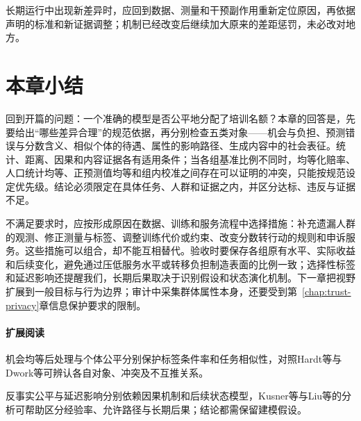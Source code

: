 长期运行中出现新差异时，应回到数据、测量和干预副作用重新定位原因，再依据声明的标准和新证据调整；机制已经改变后继续加大原来的差距惩罚，未必改对地方。

\section{本章小结}
\label{sec:fairness-summary}

回到开篇的问题：一个准确的模型是否公平地分配了培训名额？本章的回答是，先要给出“哪些差异合理”的规范依据，再分别检查五类对象——机会与负担、预测错误与分数含义、相似个体的待遇、属性的影响路径、生成内容中的社会表征。统计、距离、因果和内容证据各有适用条件；当各组基准比例不同时，均等化赔率、人口统计均等、正预测值均等和组内校准之间存在可以证明的冲突，只能按规范设定优先级。结论必须限定在具体任务、人群和证据之内，并区分达标、违反与证据不足。

不满足要求时，应按形成原因在数据、训练和服务流程中选择措施：补充遗漏人群的观测、修正测量与标签、调整训练代价或约束、改变分数转行动的规则和申诉服务。这些措施可以组合，却不能互相替代。验收时要保存各组原有水平、实际收益和后续变化，避免通过压低服务水平或转移负担制造表面的比例一致；选择性标签和延迟影响还提醒我们，长期后果取决于识别假设和状态演化机制。下一章把视野扩展到一般目标与行为边界；审计中采集群体属性本身，还要受到第~\ref{chap:trust-privacy}章信息保护要求的限制。

\paragraph{扩展阅读}

机会均等后处理与个体公平分别保护标签条件率和任务相似性，对照Hardt等与Dwork等可辨认各自对象、冲突及不互推关系。

反事实公平与延迟影响分别依赖因果机制和后续状态模型，Kusner等与Liu等的分析可帮助区分经验率、允许路径与长期后果；结论都需保留建模假设。
